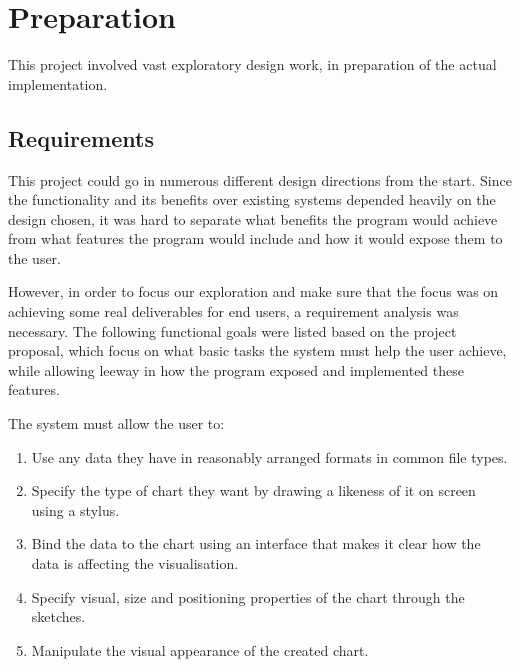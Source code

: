 \chapter{Preparation}
This project involved vast exploratory design work, in preparation of the actual implementation.

	\section{Requirements}
	This project could go in numerous different design directions from the start. Since the functionality and its benefits over existing systems depended heavily on the design chosen, it was hard to separate what benefits the program would achieve from what features the program would include and how it would expose them to the user. 
	
	However, in order to focus our exploration and make sure that the focus was on achieving some real deliverables for end users, a requirement analysis was necessary. The following functional goals were listed based on the project proposal, which focus on what basic tasks the system must help the user achieve, while allowing leeway in how the program exposed and implemented these features.
	
	The system must allow the user to:
	\begin{enumerate}[label=\bfseries Core \arabic*:]
		\item Use any data they have in reasonably arranged formats in common file types.
		\item Specify the type of chart they want by drawing a likeness of it on screen using a stylus.
		\item Bind the data to the chart using an interface that makes it clear how the data is affecting the visualisation.
		\item Specify visual, size and positioning properties of the chart through the sketches.
		\item Manipulate the visual appearance of the created chart.
	\end{enumerate}
	
